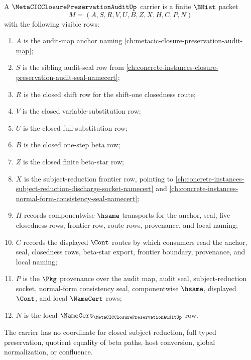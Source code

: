 \begin{definition}
\label{def:metacic-closure-preservation-audit-packet}
A $\MetaCICClosurePreservationAuditUp$ carrier is a finite $\BHist$ packet
$$
M=(A,S,R,V,U,B,Z,X,H,C,P,N)
$$
with the following visible rows:
\begin{enumerate}
\item $A$ is the audit-map anchor naming \autoref{ch:metacic-closure-preservation-audit-map};
\item $S$ is the sibling audit-seal row from \autoref{ch:concrete-instances-closure-preservation-audit-seal-namecert};
\item $R$ is the closed shift row for the shift-one closedness route;
\item $V$ is the closed variable-substitution row;
\item $U$ is the closed full-substitution row;
\item $B$ is the closed one-step beta row;
\item $Z$ is the closed finite beta-star row;
\item $X$ is the subject-reduction frontier row, pointing to \autoref{ch:concrete-instances-subject-reduction-discharge-socket-namecert} and \autoref{ch:concrete-instances-normal-form-consistency-seal-namecert};
\item $H$ records componentwise $\hsame$ transports for the anchor, seal, five closedness rows, frontier row, route rows, provenance, and local naming;
\item $C$ records the displayed $\Cont$ routes by which consumers read the anchor, seal, closedness rows, beta-star export, frontier boundary, provenance, and local naming;
\item $P$ is the $\Pkg$ provenance over the audit map, audit seal, subject-reduction socket, normal-form consistency seal, componentwise $\hsame$, displayed $\Cont$, and local $\NameCert$ rows;
\item $N$ is the local $\NameCert_{\MetaCICClosurePreservationAuditUp}$ row.
\end{enumerate}
The carrier has no coordinate for closed subject reduction, full typed preservation, quotient equality of beta paths, host conversion, global normalization, or confluence.
\end{definition}

